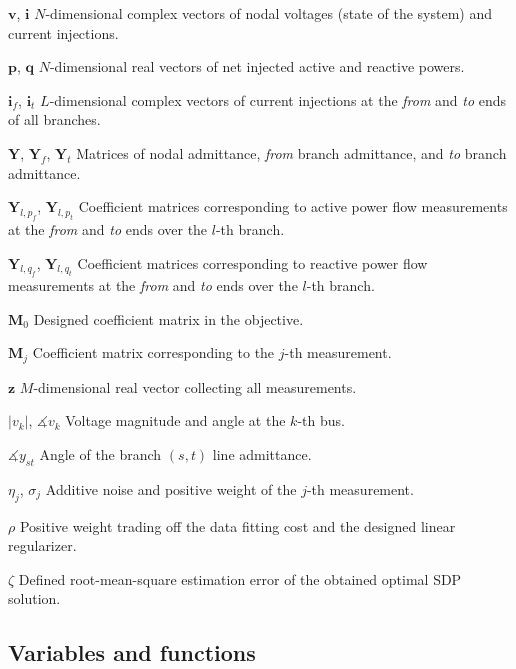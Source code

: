 \documentclass[journal,twoside]{IEEEtran}
\newcommand{\bi}{\mathbf{i}}
\newcommand{\bp}{\mathbf{p}}
\newcommand{\bq}{\mathbf{q}}
\newcommand{\bv}{\mathbf{v}}
\newcommand{\bz}{\mathbf{z}}
\newcommand{\bM}{\mathbf{M}}
\newcommand{\bY}{\mathbf{Y}}
\begin{document}
\begin{IEEEdescription}
\item[$\bv$, $\bi$] $N$-dimensional complex vectors of nodal voltages (state of the system) and current injections.
\item[$\bp$, $\bq$] $N$-dimensional real vectors of net injected active and reactive powers.
\item[$\bi_{f}$, $\bi_{t}$] $L$-dimensional complex vectors of current injections at the \emph{from} and \emph{to} ends of all branches.
\item[$\mathbf{Y}$, $\mathbf{Y}_f$, $\mathbf{Y}_t$] Matrices of nodal admittance, \emph{from} branch admittance, and \emph{to} branch admittance.
\item[$\bY_{l,p_{f}}$, $\bY_{l,p_{t}}$] Coefficient matrices corresponding to active power flow measurements at the \emph{from} and \emph{to} ends over the $l$-th branch.
\item[$\bY_{l,q_{f}}$, $\bY_{l,q_{t}}$] Coefficient matrices corresponding to reactive power flow measurements at the \emph{from} and \emph{to} ends over the $l$-th branch.
\item[$\bM_0$] Designed coefficient matrix in the objective.
\item[$\bM_j$] Coefficient matrix corresponding to the $j$-th measurement.
\item[$\bz$]  $M$-dimensional real vector collecting all measurements.
\item[$|v_k|$, $\measuredangle v_{k}$] Voltage magnitude and angle at the $k$-th bus.
\item[$\measuredangle y_{st}$] Angle of the branch $(s,t)$ line admittance.
\item[$\eta_j$, $\sigma_j$] Additive noise and positive weight of the $j$-th measurement.
\item[$\rho$] Positive weight trading off the data fitting cost and the designed linear regularizer.
\item[$\zeta$] Defined root-mean-square estimation error of the obtained optimal SDP solution.


\end{IEEEdescription}



\subsection{Variables and functions}
\end{document}
